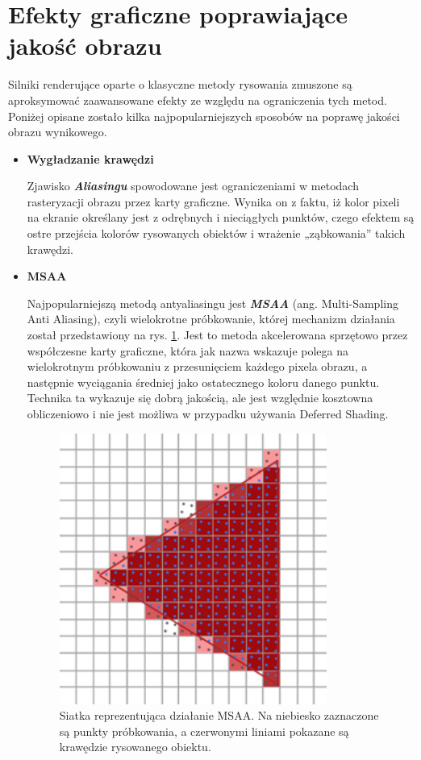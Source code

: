 \section{Efekty graficzne poprawiające jakość obrazu}

Silniki renderujące oparte o klasyczne metody rysowania zmuszone są aproksymować zaawansowane efekty ze względu na ograniczenia tych metod. Poniżej opisane zostało kilka najpopularniejszych sposobów na poprawę jakości obrazu wynikowego.

\begin{itemize}
	\item \textbf{Wygładzanie krawędzi}

	Zjawisko \emph{\textbf{Aliasingu}} spowodowane jest ograniczeniami w metodach rasteryzacji obrazu przez karty graficzne. Wynika on z faktu, iż kolor pixeli na ekranie określany jest z odrębnych i nieciągłych punktów, czego efektem są ostre przejścia kolorów rysowanych obiektów i wrażenie „ząbkowania'' takich krawędzi.
	
	\item \textbf{MSAA}
	
	Najpopularniejszą metodą antyaliasingu jest \emph{\textbf{MSAA}} (ang. Multi-Sampling Anti Aliasing), czyli wielokrotne próbkowanie, której mechanizm działania został przedstawiony na rys. \ref{intro-msaa}. Jest to metoda akcelerowana sprzętowo przez współczesne karty graficzne, która jak nazwa wskazuje polega na wielokrotnym próbkowaniu z przesunięciem każdego pixela obrazu, a następnie wyciągania średniej jako ostatecznego koloru danego punktu. Technika ta wykazuje się dobrą jakością, ale jest względnie kosztowna obliczeniowo i nie jest możliwa w przypadku używania Deferred Shading.
	
	\begin{figure}[htbp]
		\centering
		\includegraphics[width=3.4483in,height=3.5in]{images/9_MSAA_grid.png}
		\caption{Siatka reprezentująca działanie MSAA. Na niebiesko zaznaczone są punkty próbkowania, a czerwonymi liniami pokazane są krawędzie rysowanego obiektu. \cite{learnopengl:antialiasing:2024}}
		\label{intro-msaa}
	\end{figure}


\end{itemize}
